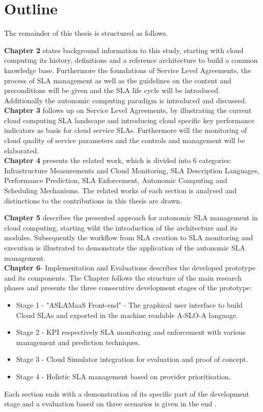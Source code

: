 \section{Outline}
The remainder of this thesis is structured as follows. 

\textbf{Chapter 2} states background information to this study, starting with cloud computing its history,  definitions and a reference architecture to build a common knowledge base. Furthermore the foundations of Service Level Agreements, the process of SLA management as well as the guidelines on the content and preconditions will be given and the SLA life cycle will be introduced. Additionally the autonomic computing paradigm is introduced and discussed.\\

\textbf{Chapter 3} follows up on Service Level Agreements, by illustrating the current cloud computing SLA landscape and introducing cloud specific key performance indicators as basis for cloud service SLAs. Furthermore will the monitoring of cloud quality of service parameters and the controls and management will be elaborated.\\

\textbf{Chapter 4} presents the related work, which is divided into 6 categories: Infrastructure Measurements and Cloud Monitoring, SLA Description Languages, Performance Prediction, SLA Enforcement, Autonomic Computing and Scheduling Mechanisms. The related works of each section is analysed and distinctions to the contributions in this thesis are drawn.

\textbf{Chapter 5}  describes the presented approach for autonomic SLA management in cloud computing, starting wiht the introduction of the architecture and its modules. Subsequently the workflow from SLA creation to SLA monitoring and execution is illustrated to demonstrate the application of the autonomic SLA management.\\

\textbf{Chapter 6}- Implementation and Evaluations describes the developed prototype and its components. The Chapter follows the structure of the main research phases and presents the three consecutive development stages of the prototype:
\begin{itemize}
\item  Stage 1 - "ASLAMaaS Front-end" - The graphical user interface to build Cloud SLAs and exported in the machine readable A-SLO-A language.
 \item Stage 2 - KPI respectively SLA monitoring and enforcement with various management and prediction techniques.
 \item Stage 3 - Cloud Simulator integration for evaluation and proof of concept. 
 \item Stage 4 - Holistic SLA management based on provider prioritisation.
\end{itemize}
 Each section ends with a demonstration of its specific part of the development stage and a evaluation based on three scenarios is given in the end .\\

